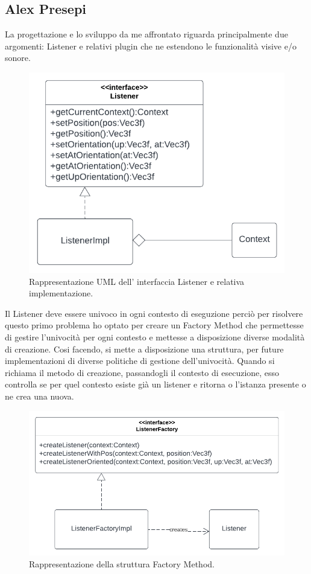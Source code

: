 \documentclass[a4paper,12pt]{report}
\begin{document}
\subsection{Alex Presepi}
La progettazione e lo sviluppo da me affrontato riguarda principalmente due argomenti: Listener e relativi plugin che ne estendono le funzionalità visive e/o sonore.
\begin{figure}[H]
\centering{}
\includegraphics[width=\textwidth]{img/listener/Listener.png}
\caption{Rappresentazione UML dell' interfaccia Listener e relativa implementazione.}
\label{img:Listener}
\end{figure}
%
Il Listener deve essere univoco in ogni contesto di eseguzione perciò per risolvere questo primo problema ho optato per creare un Factory Method che permettesse di gestire l'univocità per ogni contesto e mettesse a disposizione diverse modalità di creazione. Cosi facendo, si mette a disposizione una struttura, per future implementazioni di diverse politiche di gestione dell'univocità. Quando si richiama il metodo di creazione, 
passandogli il contesto di esecuzione, esso controlla se per quel contesto esiste già un listener e ritorna o l'istanza presente o ne crea una nuova. 
\begin{figure}[H]
\centering{}
\includegraphics[width=\textwidth]{img/listener/ListenerFactory.png}
\caption{Rappresentazione della struttura Factory Method.}
\label{img:Listener}
\end{figure}
\end{document}
